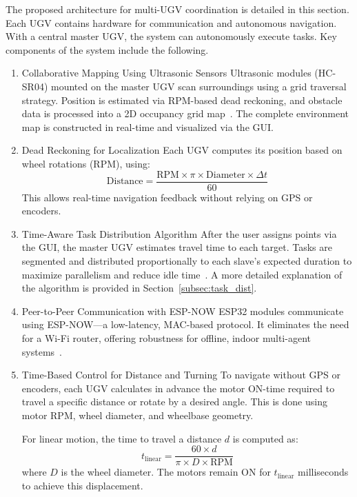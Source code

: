 \documentclass[conference]{IEEEtran}
\begin{document}
The proposed architecture for multi-UGV coordination is detailed in this section. Each UGV contains hardware for communication and autonomous navigation. With a central master UGV, the system can autonomously execute tasks. Key components of the system include the following.
\begin{enumerate}
\item {Collaborative Mapping Using Ultrasonic Sensors}
Ultrasonic modules (HC-SR04) mounted on the master UGV scan surroundings using a grid traversal strategy. Position is estimated via RPM-based dead reckoning, and obstacle data is processed into a 2D occupancy grid map~\cite{arduino_hcsr04}. The complete environment map is constructed in real-time and visualized via the GUI.

\item {Dead Reckoning for Localization}
Each UGV computes its position based on wheel rotations (RPM), using:
\begin{equation}
\text{Distance} = \frac{\text{RPM} \times \pi \times \text{Diameter} \times \Delta t}{60}
\end{equation}
This allows real-time navigation feedback without relying on GPS or encoders.

\item{Time-Aware Task Distribution Algorithm}
After the user assigns points via the GUI, the master UGV estimates travel time to each target. Tasks are segmented and distributed proportionally to each slave’s expected duration to maximize parallelism and reduce idle time~\cite{jin2024multi}. A more detailed explanation of the algorithm is provided in Section~\ref{subsec:task_dist}.

\item{Peer-to-Peer Communication with ESP-NOW}
ESP32 modules communicate using ESP-NOW—a low-latency, MAC-based protocol. It eliminates the need for a Wi-Fi router, offering robustness for offline, indoor multi-agent systems~\cite{espnowguide}.


\item{Time-Based Control for Distance and Turning}
To navigate without GPS or encoders, each UGV calculates in advance the motor ON-time required to travel a specific distance or rotate by a desired angle. This is done using motor RPM, wheel diameter, and wheelbase geometry.

For linear motion, the time to travel a distance $d$ is computed as:
\begin{equation}
t_{\text{linear}} = \frac{60 \times d}{\pi \times D \times \text{RPM}}
\end{equation}
where $D$ is the wheel diameter. The motors remain ON for $t_{\text{linear}}$ milliseconds to achieve this displacement.


\end{enumerate}
\end{document}
